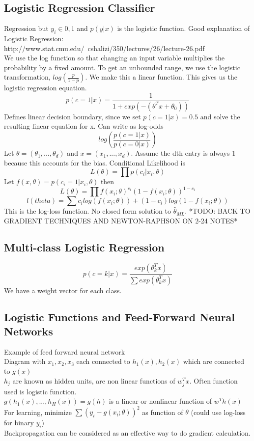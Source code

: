 \documentclass[11pt,psfig]{article}
\begin{document}
\subsection*{Logistic Regression Classifier}

Regression but $y_i \in {0,1}$ and $p(y|x)$ is the logistic function. Good explanation of Logistic Regression:\\
http://www.stat.cmu.edu/~cshalizi/350/lectures/26/lecture-26.pdf
\\
We use the log function so that changing an input variable multiplies the probability by a fixed amount. To get an unbounded range, we use the logistic transformation, $log(\frac{p}{1-p})$. We make this a linear function. This gives us the logistic regression equation. \\
\[
p(c=1|x) = \frac{1}{1 + exp(-(\theta^Tx + \theta_0))}
\]
Defines linear decision boundary, since we set $p(c=1|x)=0.5$ and solve the resulting linear equation for x. Can write as log-odds
\[
log(\frac{p(c=1|x)}{p(c=0|x)})
\]
Let $\theta = (\theta_1,...,\theta_d)$ and $x=(x_1,...,x_d)$. Assume the dth entry is always 1 because this accounts for the bias. Conditional Likelihood is
\[
L(\theta) = \prod{p(c_i|x_i,\theta)}
\]
Let $f(x,\theta) = p(c_i=1|x_i,\theta)$ then
\[
L(\theta) = \prod{f(x_i;\theta)^{c_i}(1 - f(x_i;\theta))^{1-c_i}}
\]
\[
l(theta) = \sum{c_i log(f(x_i;\theta)) + (1-c_i)log(1-f(x_i;\theta))}
\]
This is the log-loss function. No closed form solution to $\hat{\theta}_{ML}$. 
*TODO: BACK TO GRADIENT TECHNIQUES AND NEWTON-RAPHSON ON 2-24 NOTES*

\subsection*{Multi-class Logistic Regression}

\[
p(c=k|x) = \frac{exp(\theta_k^T x)}{\sum{exp(\theta_k^Tx)}}
\]
We have a weight vector for each class. 

\subsection*{Logistic Functions and Feed-Forward Neural Networks}

Example of feed forward neural network\\
Diagram with $x_1,x_2,x_3$ each connected to $h_1(x),h_2(x)$ which are connected to $g(x)$\\
$h_j$ are known as hidden units, are non linear functions of $w_j^Tx$. Often function used is logistic function. \\
$g( h_1(x),...,h_H(x)) = g(h)$ is a linear or nonlinear function of $w^Th(x)$\\
For learning, minimize $\sum{(y_i-g(x_i;\theta))^2}$ as function of $\theta$ (could use log-loss for binary $y_i$)\\
Backpropagation can be considered as an effective way to do gradient calculation.
\end{document}

